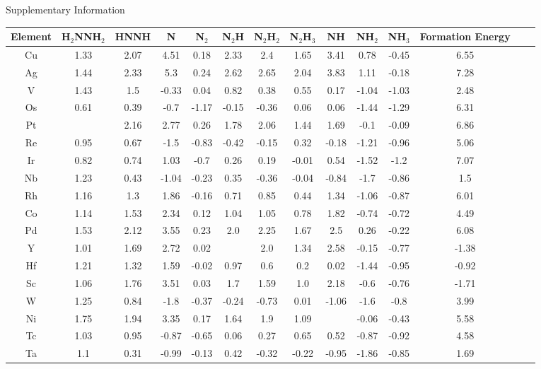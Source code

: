 Supplementary Information
\onecolumn
\begin{table}
\begin{center}
\begin{tabular}{| c | c | c | c | c | c | c | c | c | c | c | c | c | c |}
\hline
Element & H$_2$NNH$_2$ & HNNH & N & N$_2$ & N$_2$H & N$_2$H$_2$ & N$_2$H$_3$ & NH & NH$_2$ & NH$_3$ & Formation Energy\\
\hline

Cu & 1.33 & 2.07 & 4.51 & 0.18 & 2.33 & 2.4 & 1.65 & 3.41 & 0.78 & -0.45 & 6.55 \\
Ag & 1.44 & 2.33 & 5.3 & 0.24 & 2.62 & 2.65 & 2.04 & 3.83 & 1.11 & -0.18 & 7.28 \\
V & 1.43 & 1.5 & -0.33 & 0.04 & 0.82 & 0.38 & 0.55 & 0.17 & -1.04 & -1.03 & 2.48 \\
Os & 0.61 & 0.39 & -0.7 & -1.17 & -0.15 & -0.36 & 0.06 & 0.06 & -1.44 & -1.29 & 6.31 \\
Pt &  & 2.16 & 2.77 & 0.26 & 1.78 & 2.06 & 1.44 & 1.69 & -0.1 & -0.09 & 6.86 \\
Re & 0.95 & 0.67 & -1.5 & -0.83 & -0.42 & -0.15 & 0.32 & -0.18 & -1.21 & -0.96 & 5.06 \\
Ir & 0.82 & 0.74 & 1.03 & -0.7 & 0.26 & 0.19 & -0.01 & 0.54 & -1.52 & -1.2 & 7.07 \\
Nb & 1.23 & 0.43 & -1.04 & -0.23 & 0.35 & -0.36 & -0.04 & -0.84 & -1.7 & -0.86 & 1.5 \\
Rh & 1.16 & 1.3 & 1.86 & -0.16 & 0.71 & 0.85 & 0.44 & 1.34 & -1.06 & -0.87 & 6.01 \\
Co & 1.14 & 1.53 & 2.34 & 0.12 & 1.04 & 1.05 & 0.78 & 1.82 & -0.74 & -0.72 & 4.49 \\
Pd & 1.53 & 2.12 & 3.55 & 0.23 & 2.0 & 2.25 & 1.67 & 2.5 & 0.26 & -0.22 & 6.08 \\
Y & 1.01 & 1.69 & 2.72 & 0.02 &  & 2.0 & 1.34 & 2.58 & -0.15 & -0.77 & -1.38 \\
Hf & 1.21 & 1.32 & 1.59 & -0.02 & 0.97 & 0.6 & 0.2 & 0.02 & -1.44 & -0.95 & -0.92 \\
Sc & 1.06 & 1.76 & 3.51 & 0.03 & 1.7 & 1.59 & 1.0 & 2.18 & -0.6 & -0.76 & -1.71 \\
W & 1.25 & 0.84 & -1.8 & -0.37 & -0.24 & -0.73 & 0.01 & -1.06 & -1.6 & -0.8 & 3.99 \\
Ni & 1.75 & 1.94 & 3.35 & 0.17 & 1.64 & 1.9 & 1.09 &  & -0.06 & -0.43 & 5.58 \\
Tc & 1.03 & 0.95 & -0.87 & -0.65 & 0.06 & 0.27 & 0.65 & 0.52 & -0.87 & -0.92 & 4.58 \\
Ta & 1.1 & 0.31 & -0.99 & -0.13 & 0.42 & -0.32 & -0.22 & -0.95 & -1.86 & -0.85 & 1.69 \\

\end{tabular}
\end{center}
\end{table}

